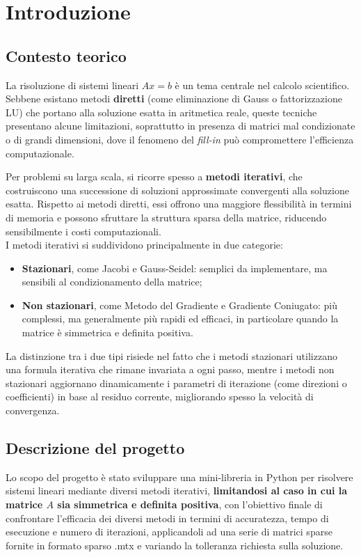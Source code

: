 \section{Introduzione}

\subsection{Contesto teorico}
La risoluzione di sistemi lineari \(Ax = b\) è un tema centrale nel calcolo scientifico. Sebbene esistano metodi \textbf{diretti} (come eliminazione di Gauss o fattorizzazione LU) che portano alla soluzione esatta in aritmetica reale, queste tecniche presentano alcune limitazioni, soprattutto in presenza di matrici mal condizionate o di grandi dimensioni, dove il fenomeno del \textit{fill-in} può compromettere l’efficienza computazionale.

Per problemi su larga scala, si ricorre spesso a \textbf{metodi iterativi}, che costruiscono una successione di soluzioni approssimate convergenti alla soluzione esatta. Rispetto ai metodi diretti, essi offrono una maggiore flessibilità in termini di memoria e possono sfruttare la struttura sparsa della matrice, riducendo sensibilmente i costi computazionali.\\

I metodi iterativi si suddividono principalmente in due categorie:
\begin{itemize}
    \item \textbf{Stazionari}, come Jacobi e Gauss-Seidel: semplici da implementare, ma sensibili al condizionamento della matrice;
    \item \textbf{Non stazionari}, come Metodo del Gradiente e Gradiente Coniugato: più complessi, ma generalmente più rapidi ed efficaci, in particolare quando la matrice è simmetrica e definita positiva.
\end{itemize}

La distinzione tra i due tipi risiede nel fatto che i metodi stazionari utilizzano una formula iterativa che rimane invariata a ogni passo, mentre i metodi non stazionari aggiornano dinamicamente i parametri di iterazione (come direzioni o coefficienti) in base al residuo corrente, migliorando spesso la velocità di convergenza.


\subsection{Descrizione del progetto}
Lo scopo del progetto è stato sviluppare una mini-libreria in Python per risolvere sistemi lineari mediante diversi metodi iterativi, \textbf{limitandosi al caso in cui la matrice \(A\) sia simmetrica e definita positiva}, con l'obiettivo finale di confrontare l’efficacia dei diversi metodi in termini di accuratezza, tempo di esecuzione e numero di iterazioni, applicandoli ad una serie di matrici sparse fornite in formato sparso .mtx e variando la tolleranza richiesta sulla soluzione.

